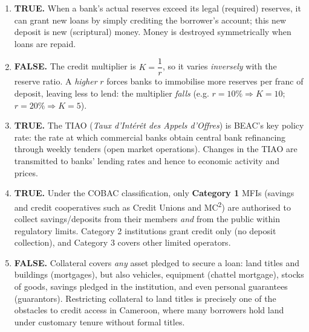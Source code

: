 \documentclass[11pt]{article}
\begin{document}
\begin{corrige}

\begin{enumerate}
\item \textbf{TRUE.} When a bank's actual reserves exceed its legal (required) reserves, it can grant new loans by simply crediting the borrower's account; this new deposit is new (scriptural) money. Money is destroyed symmetrically when loans are repaid.

\item \textbf{FALSE.} The credit multiplier is $K = \dfrac{1}{r}$, so it varies \emph{inversely} with the reserve ratio. A \emph{higher} $r$ forces banks to immobilise more reserves per franc of deposit, leaving less to lend: the multiplier \emph{falls} (e.g. $r = 10\% \Rightarrow K = 10$; $r = 20\% \Rightarrow K = 5$).

\item \textbf{TRUE.} The TIAO (\emph{Taux d'Intérêt des Appels d'Offres}) is BEAC's key policy rate: the rate at which commercial banks obtain central bank refinancing through weekly tenders (open market operations). Changes in the TIAO are transmitted to banks' lending rates and hence to economic activity and prices.

\item \textbf{TRUE.} Under the COBAC classification, only \textbf{Category 1} MFIs (savings and credit cooperatives such as Credit Unions and MC\textsuperscript{2}) are authorised to collect savings/deposits from their members \emph{and} from the public within regulatory limits. Category 2 institutions grant credit only (no deposit collection), and Category 3 covers other limited operators.

\item \textbf{FALSE.} Collateral covers \emph{any} asset pledged to secure a loan: land titles and buildings (mortgages), but also vehicles, equipment (chattel mortgage), stocks of goods, savings pledged in the institution, and even personal guarantees (guarantors). Restricting collateral to land titles is precisely one of the obstacles to credit access in Cameroon, where many borrowers hold land under customary tenure without formal titles.
\end{enumerate}
\end{corrige}
\end{document}
